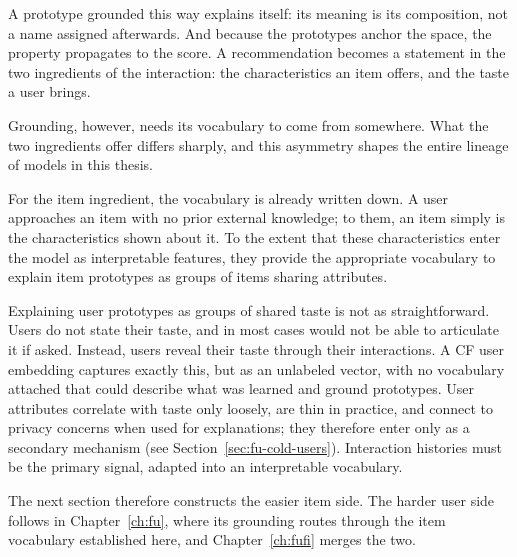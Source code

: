 A prototype grounded this way explains itself: its meaning is its
composition, not a name assigned afterwards. And because the prototypes
anchor the space, the property propagates to the score. A recommendation
becomes a statement in the two ingredients of the interaction: the
characteristics an item offers, and the taste a user brings.

Grounding, however, needs its vocabulary to come from somewhere. What the two
ingredients offer differs sharply, and this asymmetry shapes the entire
lineage of models in this thesis.


For the item ingredient, the vocabulary is already written down. A user
approaches an item with no prior external knowledge; to them, an item simply
is the characteristics shown about it. To the extent that these
characteristics enter the model as interpretable features, they provide the
appropriate vocabulary to explain item prototypes as groups of items sharing
attributes.

Explaining user prototypes as groups of shared taste is not as
straightforward. Users do not state their taste, and in most cases would not
be able to articulate it if asked. Instead, users reveal their taste through
their interactions. A CF user embedding captures exactly this, but as an
unlabeled vector, with no vocabulary attached that could describe what was
learned and ground prototypes. User attributes correlate with taste only
loosely, are thin in practice, and connect to privacy concerns when used for
explanations; they therefore enter only as a secondary mechanism (see
Section~\ref{sec:fu-cold-users}). Interaction histories must be the primary
signal, adapted into an interpretable vocabulary.

The next section therefore constructs the easier item side. The harder user
side follows in Chapter~\ref{ch:fu}, where its grounding routes through the
item vocabulary established here, and Chapter~\ref{ch:fufi} merges the two.
